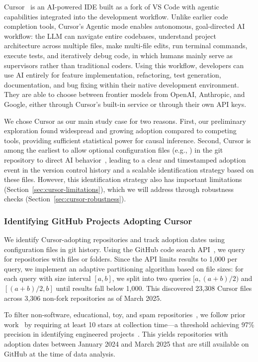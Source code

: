 Cursor~\cite{cursor} is an AI-powered IDE built as a fork of VS Code with agentic capabilities integrated into the development workflow. 
Unlike earlier code completion tools, Cursor's Agentic mode enables autonomous, goal-directed AI workflow: the LLM can navigate entire codebases, understand project architecture across multiple files, make multi-file edits, run terminal commands, execute tests, and iteratively debug code, in which humans mainly serve as supervisors rather than traditional coders. 
Using this workflow, developers can use AI entirely for feature implementation, refactoring, test generation, documentation, and bug fixing within their native development environment. 
They are able to choose between frontier models from OpenAI, Anthropic, and Google, either through Cursor's built-in service or through their own API keys.

We chose Cursor as our main study case for two reasons. 
First, our preliminary exploration found widespread and growing adoption compared to competing tools, providing sufficient statistical power for causal inference. 
Second, Cursor is among the earliest to allow optional configuration files (e.g., ) in the git repository to direct AI behavior~\cite{cursor-rules}, leading to a clear and timestamped adoption event in the version control history and a scalable identification strategy based on these files.
However, this identification strategy also has important limitations (Section~\ref{sec:cursor-limitations}), which we will address through robustness checks (Section~\ref{sec:cursor-robustness}).

\subsubsection{Identifying GitHub Projects Adopting Cursor}
\label{sec:find-cursor-repo}

We identify Cursor-adopting repositories and track adoption dates using configuration files in git history. Using the GitHub code search API~\cite{github-search-api}, we query for repositories with  files or  folders. Since the API limits results to 1,000 per query, we implement an adaptive partitioning algorithm based on file sizes: for each query with size interval $[a, b]$, we split into two queries $[a, (a+b)/2)$ and $[(a+b)/2, b]$ until results fall below 1,000. This discovered 23,308 Cursor files across 3,306 non-fork repositories as of March 2025.

To filter non-software, educational, toy, and spam repositories~\cite{DBLP:journals/ese/KalliamvakouGBS16, DBLP:journals/corr/abs-2412-13459}, we follow prior work~\cite{DBLP:journals/corr/abs-2502-06662, DBLP:journals/tse/HeHZZ23, DBLP:conf/sigsoft/Soto-ValeroDB21} by requiring at least 10 stars at collection time---a threshold achieving 97\% precision in identifying engineered projects~\cite{DBLP:journals/ese/MunaiahKCN17}. This yields \numtreated repositories with adoption dates between January 2024 and March 2025 that are still available on GitHub at the time of data analysis.

